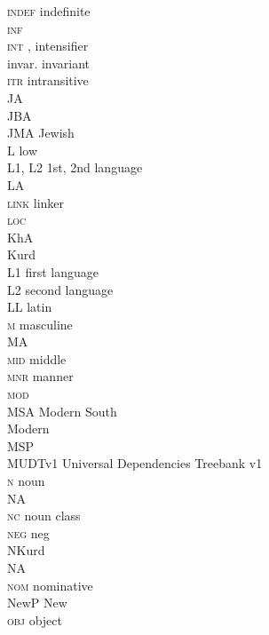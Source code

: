 \begin{refsection}
\begin{multicols}{2}
\begin{tabbing}
\textsc{indef} \> indefinite \\
\textsc{inf} \>  \\
\textsc{int} \> , intensifier \\
invar. \> invariant \\
\textsc{itr} \> intransitive \\
JA \>   \\
JBA \>   \\
JMA \> Jewish   \\
L \> low  \\
\textsc{L1, L2} \> 1st, 2nd language \\
LA \>   \\
\textsc{link} \> linker \\
\textsc{loc} \>  \\
KhA \>   \\
Kurd \>  \\
L1 \> first language \\
L2 \> second language \\
LL \>  latin \\
\textsc{m} \> masculine \\
MA \>   \\
\textsc{mid} \> middle \\
\textsc{mnr} \> manner \\
\textsc{mod} \>  \\
MSA \> Modern South  \\
 \> Modern  \\
MSP \>   \\
MUDTv1 \>  Universal Dependencies Treebank v1 \\
\textsc{n} \> noun \\
NA \>  \\
\textsc{nc} \> noun class \\
\textsc{neg} \> neg \\
NKurd \>   \\
NA \>  \\
\textsc{nom} \> nominative \\
NewP   \>  New \\
\textsc{obj} \> object \\

\end{tabbing}
\end{multicols}
\end{refsection}
